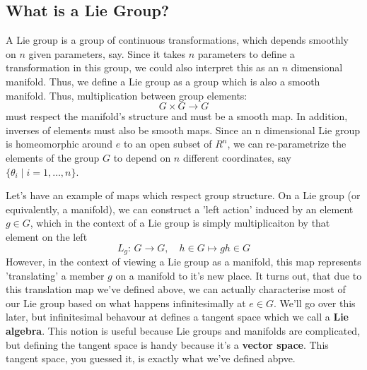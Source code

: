 \subsection{What is a Lie Group?}
A Lie group is a group of continuous transformations, which depends smoothly on $n$ given parameters, say. Since it takes $n$ parameters to define a transformation in this group, we could also interpret this as an $n$ dimensional manifold. Thus, we define a Lie group as a group which is also a smooth manifold. Thus, multiplication between group elements: 
\[ 
	G \times G \rightarrow G
\]
must respect the manifold's structure and must be a smooth map. In addition, inverses of elements must also be smooth maps. 
Since an n dimensional Lie group is homeomorphic around $e$ to an open subset of $R^n$, we can re-parametrize the elements of the group $G$ to depend on $n$ different coordinates, say $\{ \theta_i \mid i = 1, \dots, n\} $. 

Let's have an example of maps which respect group structure. On a Lie group (or equivalently, a manifold), we can construct a 'left action' induced by an element $g \in G$, which in the context of a Lie group is simply multiplicaiton by that element on the left 
\[ 
	L_g: \, G \rightarrow G, \quad h \in G \mapsto gh \in G 
\] 
However, in the context of viewing a Lie group as a manifold, this map represents 'translating' a member $g$ on a manifold to it's new place. It turns out, that due to this translation map we've defined above, we can actually characterise most of our Lie group based on what happens infinitesimally at $e \in G$. We'll go over this later, but infinitesimal behavour at defines a tangent space which we call a \textbf{Lie algebra}. This notion is useful because Lie groups and manifolds are complicated, but defining the tangent space is handy because it's a \textbf{vector space}. This tangent space, you guessed it, is exactly what we've defined abpve.  

